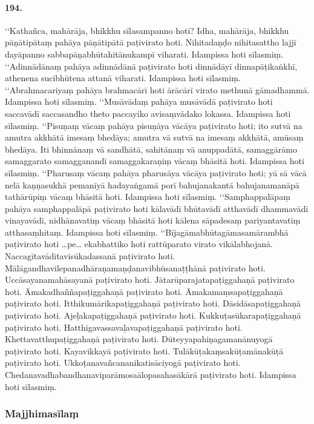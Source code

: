 \paragraph{194.} ‘‘Kathañca, mahārāja, bhikkhu sīlasampanno hoti? Idha, mahārāja, bhikkhu pāṇātipātaṃ pahāya pāṇātipātā paṭivirato hoti. Nihitadaṇḍo nihitasattho lajjī dayāpanno sabbapāṇabhūtahitānukampī viharati. Idampissa hoti sīlasmiṃ. ‘‘Adinnādānaṃ pahāya adinnādānā paṭivirato hoti dinnādāyī dinnapāṭikaṅkhī, athenena sucibhūtena attanā viharati. Idampissa hoti sīlasmiṃ. ‘‘Abrahmacariyaṃ pahāya brahmacārī hoti ārācārī virato methunā gāmadhammā. Idampissa hoti sīlasmiṃ. ‘‘Musāvādaṃ pahāya musāvādā paṭivirato hoti saccavādī saccasandho theto paccayiko avisaṃvādako lokassa. Idampissa hoti sīlasmiṃ. ‘‘Pisuṇaṃ vācaṃ pahāya pisuṇāya vācāya paṭivirato hoti; ito sutvā na amutra akkhātā imesaṃ bhedāya; amutra vā sutvā na imesaṃ akkhātā, amūsaṃ bhedāya. Iti bhinnānaṃ vā sandhātā, sahitānaṃ vā anuppadātā, samaggārāmo samaggarato samagganandī samaggakaraṇiṃ vācaṃ bhāsitā hoti. Idampissa hoti sīlasmiṃ. ‘‘Pharusaṃ vācaṃ pahāya pharusāya vācāya paṭivirato hoti; yā sā vācā nelā kaṇṇasukhā pemanīyā hadayaṅgamā porī bahujanakantā bahujanamanāpā tathārūpiṃ vācaṃ bhāsitā hoti. Idampissa hoti sīlasmiṃ. ‘‘Samphappalāpaṃ pahāya samphappalāpā paṭivirato hoti kālavādī bhūtavādī atthavādī dhammavādī vinayavādī, nidhānavatiṃ vācaṃ bhāsitā hoti kālena sāpadesaṃ pariyantavatiṃ atthasaṃhitaṃ. Idampissa hoti sīlasmiṃ. ‘‘Bījagāmabhūtagāmasamārambhā paṭivirato hoti …pe… ekabhattiko hoti rattūparato virato vikālabhojanā. Naccagītavāditavisūkadassanā paṭivirato hoti. Mālāgandhavilepanadhāraṇamaṇḍanavibhūsanaṭṭhānā paṭivirato hoti. Uccāsayanamahāsayanā paṭivirato hoti. Jātarūparajatapaṭiggahaṇā paṭivirato hoti. Āmakadhaññapaṭiggahaṇā paṭivirato hoti. Āmakamaṃsapaṭiggahaṇā paṭivirato hoti. Itthikumārikapaṭiggahaṇā paṭivirato hoti. Dāsidāsapaṭiggahaṇā paṭivirato hoti. Ajeḷakapaṭiggahaṇā paṭivirato hoti. Kukkuṭasūkarapaṭiggahaṇā paṭivirato hoti. Hatthigavassavaḷavapaṭiggahaṇā paṭivirato hoti. Khettavatthupaṭiggahaṇā paṭivirato hoti. Dūteyyapahiṇagamanānuyogā paṭivirato hoti. Kayavikkayā paṭivirato hoti. Tulākūṭakaṃsakūṭamānakūṭā paṭivirato hoti. Ukkoṭanavañcananikatisāciyogā paṭivirato hoti. Chedanavadhabandhanaviparāmosaālopasahasākārā paṭivirato hoti. Idampissa hoti sīlasmiṃ.


\subsubsection{Majjhimasīlaṃ}

